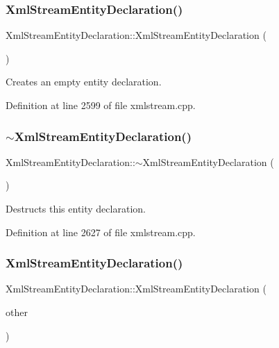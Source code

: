 \subsubsection{\texorpdfstring{Xml\+Stream\+Entity\+Declaration()}{XmlStreamEntityDeclaration()}\hspace{0.1cm}{\footnotesize\ttfamily [1/2]}}
{\footnotesize\ttfamily Xml\+Stream\+Entity\+Declaration\+::\+Xml\+Stream\+Entity\+Declaration (\begin{DoxyParamCaption}{ }\end{DoxyParamCaption})}

Creates an empty entity declaration. 

Definition at line 2599 of file xmlstream.\+cpp.

\mbox{\label{class_xml_stream_entity_declaration_ab0206ec465e688a62948c2aff01d8ff4}} 
\subsubsection{\texorpdfstring{$\sim$\+Xml\+Stream\+Entity\+Declaration()}{~XmlStreamEntityDeclaration()}}
{\footnotesize\ttfamily Xml\+Stream\+Entity\+Declaration\+::$\sim$\+Xml\+Stream\+Entity\+Declaration (\begin{DoxyParamCaption}{ }\end{DoxyParamCaption})}

Destructs this entity declaration. 

Definition at line 2627 of file xmlstream.\+cpp.

\mbox{\label{class_xml_stream_entity_declaration_ab12e983409a46173d89968dc503b2f20}} 
\subsubsection{\texorpdfstring{Xml\+Stream\+Entity\+Declaration()}{XmlStreamEntityDeclaration()}\hspace{0.1cm}{\footnotesize\ttfamily [2/2]}}
{\footnotesize\ttfamily Xml\+Stream\+Entity\+Declaration\+::\+Xml\+Stream\+Entity\+Declaration (\begin{DoxyParamCaption}\item[{const \hyperlink{class_xml_stream_entity_declaration}{Xml\+Stream\+Entity\+Declaration} \&}]{other }\end{DoxyParamCaption})}


